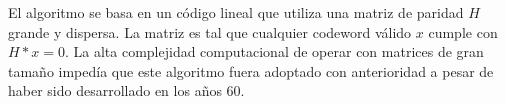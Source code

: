 El algoritmo se basa en un código lineal que utiliza una matriz de paridad $H$ grande y dispersa. La matriz es tal que cualquier codeword válido $x$ cumple con $H*x=0$. La alta complejidad computacional de operar con matrices de gran tamaño impedía que este algoritmo fuera adoptado con anterioridad a pesar de haber sido desarrollado en los años 60.










